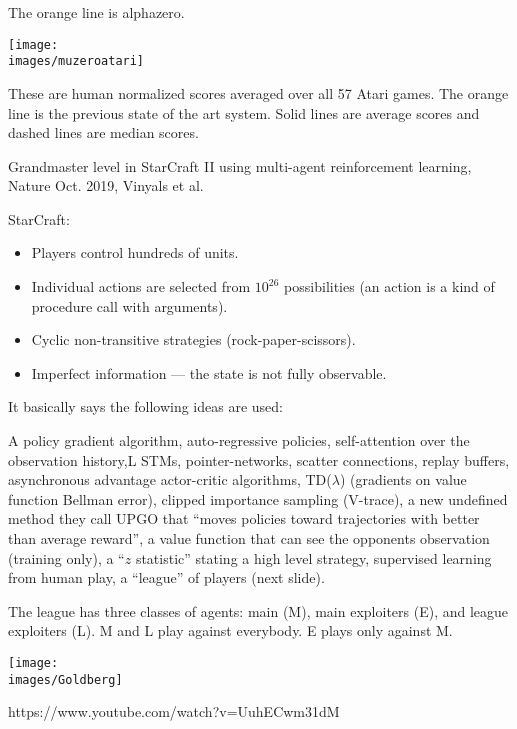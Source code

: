 {{The orange line is alphazero.
}


\centerline{\texttt{[image: \\images/muzeroatari]}}

{\huge
  These are human normalized scores averaged over all 57 Atari games.  The orange line is the previous state of the art system.  Solid lines are average scores and dashed lines are median scores.
}



Grandmaster level in StarCraft II using multi-agent reinforcement learning, Nature Oct. 2019, Vinyals et al.

\vfill
StarCraft:

\begin{itemize}
\item Players control hundreds of units.

\vfill
\item Individual actions are selected from $10^{26}$ possibilities (an action is a kind of procedure call with arguments).

\vfill
\item Cyclic non-transitive strategies (rock-paper-scissors).

\vfill
\item Imperfect information --- the state is not fully observable.
\end{itemize}


It basically says the following ideas are used:

A policy gradient algorithm, auto-regressive policies, self-attention over the observation history,L STMs, pointer-networks, scatter connections,
replay buffers, asynchronous advantage actor-critic algorithms, TD($\lambda$) (gradients on value function Bellman error), clipped importance sampling
(V-trace), a new undefined method they call UPGO that ``moves policies toward trajectories with better than average reward'', a value function
that can see the opponents observation (training only), a ``$z$ statistic'' stating a high level strategy, 
supervised learning from human play, 
a ``league'' of players (next slide).


The league has three classes of agents: main (M), main exploiters (E), and league exploiters (L).  M and L play against everybody.
E plays only against M.


\centerline{\texttt{[image: \\images/Goldberg]}}


https://www.youtube.com/watch?v=UuhECwm31dM


}

